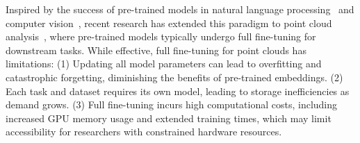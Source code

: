 
Inspired by the success of pre-trained models in natural language processing~\cite{devlin2018bert, brown2020language} and computer vision~\cite{he2020momentum, chen2020improved}, recent research has extended this paradigm to point cloud analysis~\cite{pang2022masked, yu2022point, zhang2022point, afham2022crosspoint}, where pre-trained models typically undergo full fine-tuning for downstream tasks. While effective, full fine-tuning for point clouds has limitations: (1) Updating all model parameters can lead to overfitting and catastrophic forgetting, diminishing the benefits of pre-trained embeddings. (2) Each task and dataset requires its own model, leading to storage inefficiencies as demand grows. (3) Full fine-tuning incurs high computational costs, including increased GPU memory usage and extended training times, which may limit accessibility for researchers with constrained hardware resources.

